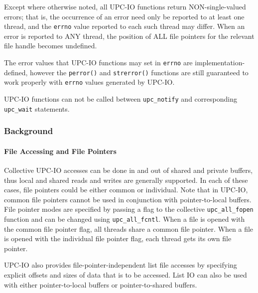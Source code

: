 \np Except where otherwise noted, all UPC-IO functions return
NON-single-valued errors; that is, the occurrence of an error need only be
reported to at least one thread, and the {\tt errno} value reported to each such
thread may differ. When an error is reported to ANY thread, the position of
ALL file pointers for the relevant file handle becomes undefined.

\np The error values that UPC-IO functions may set in {\tt errno} are
implementation-defined, however the {\tt perror()} and {\tt strerror()} functions are still
guaranteed to work properly with {\tt errno} values generated by UPC-IO.

\np UPC-IO functions can not be called between {\tt upc\_notify} and corresponding {\tt upc\_wait} statements.

\subsubsection{Background}

\paragraph{File Accessing and File Pointers}



\npf Collective UPC-IO accesses can be done in and out of shared and private
buffers, thus local and shared reads and writes are generally supported.
In each of these cases, file pointers could be either common or individual.
Note that in UPC-IO, common file pointers cannot be used in conjunction with
pointer-to-local buffers. 
File pointer modes are specified by passing a flag to the collective
{\tt upc\_all\_fopen} function and can be changed using {\tt upc\_all\_fcntl}.
When a file is opened with the common file pointer flag, all threads share a
common file pointer. When a file is opened with the individual file pointer
flag, each thread gets its own file pointer.

\np UPC-IO also provides file-pointer-independent list file accesses by specifying
explicit offsets and sizes of data that is to be accessed. List IO can also
be used with either pointer-to-local buffers or pointer-to-shared buffers.

